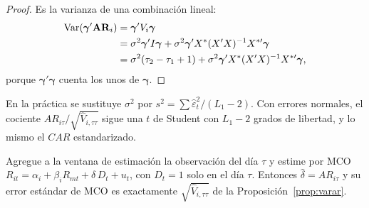 \begin{proof}
Es la varianza de una combinación lineal:
\begin{align*}
  \operatorname{Var}(\boldsymbol\gamma'\mathbf{AR}_i) &= \boldsymbol\gamma'V_i\boldsymbol\gamma\\
                                        &= \sigma^2\boldsymbol\gamma'I\boldsymbol\gamma+\sigma^2\boldsymbol\gamma'X^*(X'X)^{-1}X^{*\prime}\boldsymbol\gamma\\
                                        &= \sigma^2(\tau_2-\tau_1+1)+\sigma^2\boldsymbol\gamma'X^*(X'X)^{-1}X^{*\prime}\boldsymbol\gamma,
\end{align*}
porque $\boldsymbol\gamma'\boldsymbol\gamma$ cuenta los unos de $\boldsymbol\gamma$.
\end{proof}

En la práctica se sustituye $\sigma^2$ por $s^2=\sum\hat\varepsilon_t^2/(L_1-2)$. Con errores normales, el cociente
$AR_{i\tau}/\sqrt{\hat V_{i,\tau\tau}}$ sigue una $t$ de Student con $L_1-2$ grados de libertad, y lo mismo el
$CAR$ estandarizado.

\begin{proposicion}\label{prop:ficticia}
Agregue a la ventana de estimación la observación del día $\tau$ y estime por MCO
$R_{it}=\alpha_i+\beta_iR_{mt}+\delta\,D_t+u_t$, con $D_t=1$ solo en el día $\tau$. Entonces $\hat\delta=AR_{i\tau}$ y su error
estándar de MCO es exactamente $\sqrt{\hat V_{i,\tau\tau}}$ de la Proposición~\ref{prop:varar}.
\end{proposicion}

